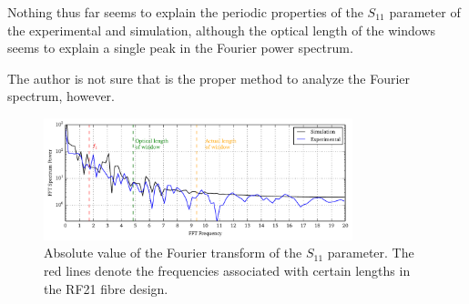 Nothing thus far seems to explain the periodic properties of the 
$S_{11}$ parameter of the experimental and simulation, although
the optical length of the windows seems to explain a single 
peak in the Fourier power spectrum. 

The author is not sure that is the proper method to
analyze the Fourier spectrum, however. 

\begin{figure}
 \centering
 \includegraphics[width=0.8\textwidth]{figs/active/fourierAnalysisS11.pdf}
 \caption[Fourier Power Spectrum]
	  {Absolute value of the Fourier transform of the $S_{11}$ parameter.
	  The red lines denote the frequencies associated with certain lengths
	  in the RF21 fibre design.}
 \label{fig:antenna.fourierAnalysis}
\end{figure}
